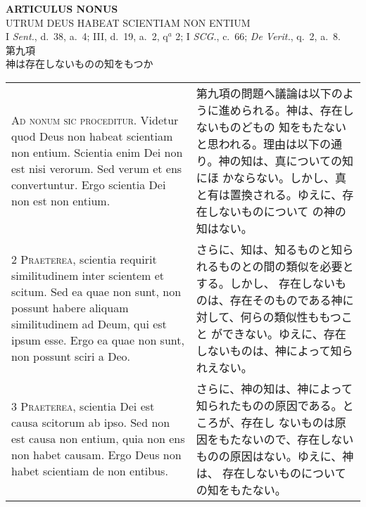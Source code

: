 \documentclass[10pt]{jsarticle} %
\begin{document}
\newpage



\begin{center}
{\Large {\bf ARTICULUS NONUS}}\\ {\large UTRUM DEUS HABEAT SCIENTIAM
NON ENTIUM}\\ {\footnotesize I {\itshape Sent.}, d.~38, a.~4; III,
d.~19, a.~2, q$^a$ 2; I {\itshape SCG.}, c.~66; {\itshape De Verit.},
q.~2, a.~8.}\\ {\Large 第九項\\神は存在しないものの知をもつか}
\end{center}

\begin{longtable}{p{21em}p{21em}}


{\huge A}{\scshape d nonum sic proceditur}. Videtur quod Deus non
habeat scientiam non entium. Scientia enim Dei non est nisi
verorum. Sed verum et ens convertuntur. Ergo scientia Dei non est non
entium.

&

第九項の問題へ議論は以下のように進められる。神は、存在しないものどもの
知をもたないと思われる。理由は以下の通り。神の知は、真についての知にほ
かならない。しかし、真と有は置換される。ゆえに、存在しないものについて
の神の知はない。

\\



{\scshape 2 Praeterea}, scientia requirit similitudinem inter scientem
et scitum. Sed ea quae non sunt, non possunt habere aliquam
similitudinem ad Deum, qui est ipsum esse. Ergo ea quae non sunt, non
possunt sciri a Deo.

&

さらに、知は、知るものと知られるものとの間の類似を必要とする。しかし、
存在しないものは、存在そのものである神に対して、何らの類似性ももつこと
ができない。ゆえに、存在しないものは、神によって知られえない。

\\



{\scshape 3 Praeterea}, scientia Dei est causa scitorum ab ipso. Sed
non est causa non entium, quia non ens non habet causam. Ergo Deus non
habet scientiam de non entibus.

&

さらに、神の知は、神によって知られたものの原因である。ところが、存在し
ないものは原因をもたないので、存在しないものの原因はない。ゆえに、神は、
存在しないものについての知をもたない。


\end{longtable}
\end{document}
